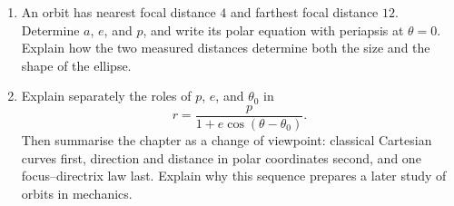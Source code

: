 \begin{enumerate}
\item An orbit has nearest focal distance $4$ and farthest focal distance $12$.
Determine $a$, $e$, and $p$, and write its polar equation with periapsis at
$\theta=0$. Explain how the two measured distances determine both the size and
the shape of the ellipse.

\item Explain separately the roles of $p$, $e$, and $\theta_0$ in
\[
r=\frac{p}{1+e\cos(\theta-\theta_0)}.
\]
Then summarise the chapter as a change of viewpoint: classical Cartesian
curves first, direction and distance in polar coordinates second, and one
focus--directrix law last. Explain why this sequence prepares a later study of
orbits in mechanics.

\end{enumerate}

